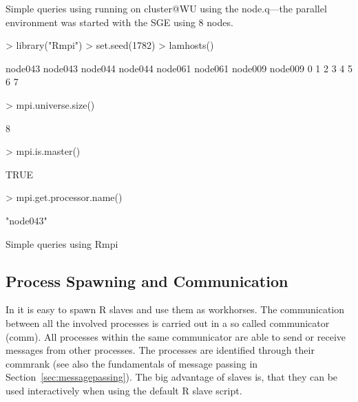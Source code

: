\begin{Example} Simple queries using \newline
running on cluster@WU using the node.q---the parallel environment was
started with the SGE using 8 nodes.

\begin{Schunk}
\begin{Sinput}
> library("Rmpi")
> set.seed(1782)
> lamhosts()
\end{Sinput}
\begin{Soutput}
node043 node043 node044 node044 node061 node061 node009 node009 
      0       1       2       3       4       5       6       7 
\end{Soutput}
\begin{Sinput}
> mpi.universe.size()
\end{Sinput}
\begin{Soutput}
[1] 8
\end{Soutput}
\begin{Sinput}
> mpi.is.master()
\end{Sinput}
\begin{Soutput}
[1] TRUE
\end{Soutput}
\begin{Sinput}
> mpi.get.processor.name()
\end{Sinput}
\begin{Soutput}
[1] "node043"
\end{Soutput}
\end{Schunk}
\caption{Simple queries using Rmpi}
\label{ex:Rmpi-init}
\end{Example}

\subsection{Process Spawning and Communication}

In  it is easy to spawn R slaves and use them as
workhorses. The 
communication between all the involved processes is carried out in a
so called communicator (comm). All processes within the same
communicator are able to send or receive messages from other
processes. The processes are identified through their commrank (see
also the fundamentals of message passing in
Section~\ref{sec:messagepassing}). The big advantage of 
slaves is, that they can be used interactively when using the default
R slave script.


